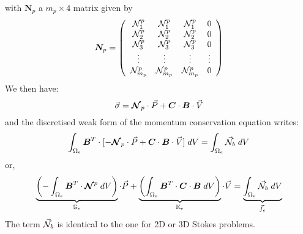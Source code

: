 with ${\bm N}_p$ a $m_p \times 4$ matrix given by
\[
{\bm N}_p
=
\left(
\begin{array}{cccc}
{{\mathcal{N}}}_1^p & {{\mathcal{N}}}_1^p & {{\mathcal{N}}}_1^p & 0   \\
{{\mathcal{N}}}_2^p & {{\mathcal{N}}}_2^p & {{\mathcal{N}}}_2^p & 0   \\
{{\mathcal{N}}}_3^p & {{\mathcal{N}}}_3^p & {{\mathcal{N}}}_3^p & 0   \\
\vdots & \vdots & \vdots & \vdots  \\
{{\mathcal{N}}}_{m_p}^p & {{\mathcal{N}}}_{m_p}^p & {{\mathcal{N}}}_{m_p}^p & 0 
\end{array}
\right)
\]
We then have:
\[
\vec{\sigma} = {\bm {{\mathcal{N}}}}_p \cdot \vec{P} 
+ {\bm C} \cdot {\bm B} \cdot \vec{V}
\]
and the discretised weak form of the momentum conservation equation writes: 
\begin{equation}
\int_{\Omega_e} {\bm B}^T \cdot 
[ - {\bm {{\mathcal{N}}}}_p  \cdot {\vec P}  + {\bm C} \cdot  {\bm B}\cdot {\vec V} ] \; dV
=
\int_{\Omega_e} \vec{{\mathcal{N}}}_b \; dV
\end{equation}
or,
\begin{equation}
\underbrace{\left(-\int_{\Omega_e} {\bm B}^T \cdot 
{\bm {{\mathcal{N}}}}^p  
\; dV \right)}_{{\mathbb{G}}_e} \cdot {\vec P} 
+
\underbrace{
\left(
\int_{\Omega_e} {\bm B}^T \cdot 
{\bm C} \cdot  {\bm B}
\; dV
\right)}_{{\mathbb{K}}_e}
\cdot {\vec V}
=
\underbrace{\int_{\Omega_e} {\vec {{\mathcal{N}}}}_b \; dV }_{{\vec f}_e}
\end{equation}
The term $\vec{{\mathcal{N}}}_b$ is identical to the one for 2D or 3D Stokes problems.


